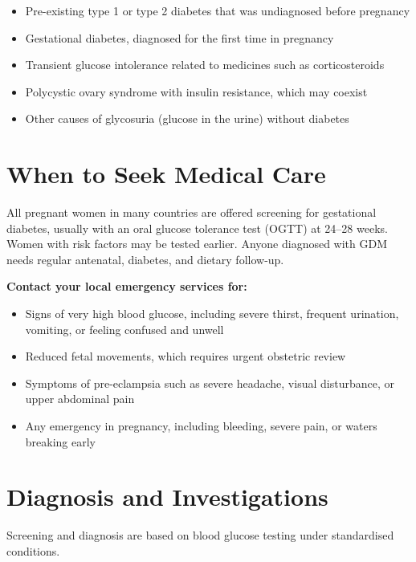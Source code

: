 \begin{itemize}
    \item Pre-existing type 1 or type 2 diabetes that was undiagnosed before pregnancy
    \item Gestational diabetes, diagnosed for the first time in pregnancy
    \item Transient glucose intolerance related to medicines such as corticosteroids
    \item Polycystic ovary syndrome with insulin resistance, which may coexist
    \item Other causes of glycosuria (glucose in the urine) without diabetes
\end{itemize}

\section*{When to Seek Medical Care}
All pregnant women in many countries are offered screening for gestational diabetes, usually with an oral glucose tolerance test (OGTT) at 24--28 weeks. Women with risk factors may be tested earlier. Anyone diagnosed with GDM needs regular antenatal, diabetes, and dietary follow-up.

\textbf{Contact your local emergency services for:}
\begin{itemize}
    \item Signs of very high blood glucose, including severe thirst, frequent urination, vomiting, or feeling confused and unwell
    \item Reduced fetal movements, which requires urgent obstetric review
    \item Symptoms of pre-eclampsia such as severe headache, visual disturbance, or upper abdominal pain
    \item Any emergency in pregnancy, including bleeding, severe pain, or waters breaking early
\end{itemize}

\section*{Diagnosis and Investigations}
Screening and diagnosis are based on blood glucose testing under standardised conditions.

